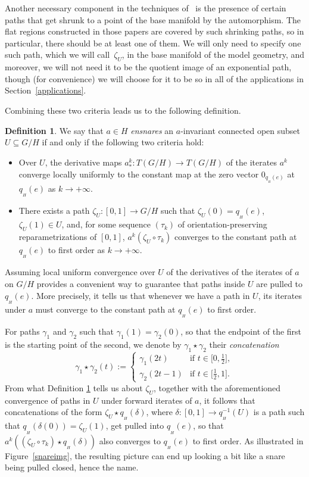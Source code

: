 \documentclass[pdftex]{sigma}
\numberwithin{equation}{section}
\theoremstyle{definition}
\newtheorem{Definition}[Theorem]{Definition}
\begin{document}
Another necessary component in the techniques of~\cite{CapMelnick2013,MelnickNeusser2016} is the presence of certain paths that get shrunk to a point of the base manifold by the automorphism. The flat regions constructed in those papers are covered by such shrinking paths, so in particular, there should be at least one of them. We will only need to specify one such path, which we will call~$\zeta_U$, in the base manifold of the model geometry, and moreover, we will not need it to be the quotient image of an exponential path, though (for convenience) we will choose for it to be so in all of the applications in Section~\ref{applications}.

Combining these two criteria leads us to the following definition.

\begin{Definition}\label{ensnaredef} We say that $a\in H$ \emph{ensnares} an $a$-invariant connected open subset $U\subseteq G/H$ if and only if the following two criteria hold:
\begin{itemize}\itemsep=0pt
\item Over $U$, the derivative maps $a^k_*\colon T(G/H)\to T(G/H)$ of the iterates $a^k$ converge locally uniformly to the constant map at the zero vector $0_{q_{{}_H}(e)}$ at $q_{{}_H}(e)$ as $k\rightarrow+\infty$.
\item There exists a path $\zeta_U\colon [0,1]\to G/H$ such that $\zeta_U(0)=q_{{}_H}(e)$, $\zeta_U(1)\in U$, and, for some sequence $(\tau_k)$ of orientation-preserving reparametrizations of $[0,1]$, $a^k(\zeta_U\circ\tau_k)$ converges to the constant path at $q_{{}_H}(e)$ to first order as $k\rightarrow+\infty$.
\end{itemize}\end{Definition}

Assuming local uniform convergence over $U$ of the derivatives of the iterates of $a$ on $G/H$ provides a convenient way to guarantee that paths inside $U$ are pulled to $q_{{}_H}(e)$. More precisely, it tells us that whenever we have a path in $U$, its iterates under $a$ must converge to the constant path at $q_{{}_H}(e)$ to first order.

For paths $\gamma_1$ and $\gamma_2$ such that $\gamma_1(1)=\gamma_2(0)$, so that the endpoint of the first is the starting point of the second, we denote by $\gamma_1\star\gamma_2$ their \emph{concatenation}
\[\gamma_1\star\gamma_2(t):= \begin{cases}\gamma_1(2t) & \text{if }t\in\bigl[0,\tfrac{1}{2}\bigr], \\
\gamma_2(2t-1) & \text{if }t\in\bigl[\tfrac{1}{2},1\bigr].\end{cases}
\]
From what Definition \ref{ensnaredef} tells us about $\zeta_U$, together with the aforementioned convergence of paths in $U$ under forward iterates of $a$, it follows that concatenations of the form $\zeta_U\star q_{{}_H}(\delta)$, where $\delta\colon [0,1]\to q_{{}_H}^{-1}(U)$ is a path such that $q_{{}_H}(\delta(0))=\zeta_U(1)$, get pulled into $q_{{}_H}(e)$, so that $a^k((\zeta_U\circ\tau_k)\star q_{{}_H}(\delta))$ also converges to $q_{{}_H}(e)$ to first order. As illustrated in Figure~\ref{snareimg}, the resulting picture can end up looking a bit like a snare being pulled closed, hence the name.
\end{document}
